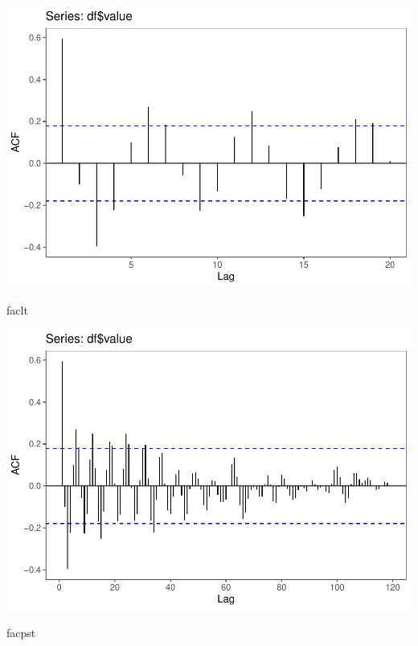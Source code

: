 \documentclass[11pt, a4paper]{report}
\newenvironment{Shaded}{\begin{snugshade}}{\end{snugshade}}
\newcommand{\NormalTok}[1]{#1}
\theoremstyle{plain}
\theoremstyle{plain}
\theoremstyle{remark}
\begin{document}
\begin{center}\includegraphics{Econo2_P3_files/figure-latex/plots-3} \end{center}

\begin{Shaded}
	\begin{Highlighting}[]
		\NormalTok{faclt}
	\end{Highlighting}
\end{Shaded}

\begin{center}\includegraphics{Econo2_P3_files/figure-latex/plots-4} \end{center}

\begin{Shaded}
	\begin{Highlighting}[]
		\NormalTok{facpst}
	\end{Highlighting}
\end{Shaded}
\end{document}
